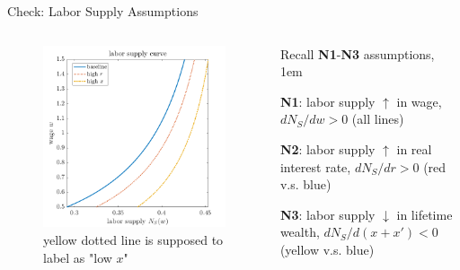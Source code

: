 \documentclass[11pt,aspectratio=43]{beamer}
\let\olditemize=\itemize
\let\endolditemize=\enditemize
\renewenvironment{itemize}{\olditemize \itemsep1em}{\endolditemize}
\theoremstyle{definition}
\begin{document}
\begin{frame}{Check: Labor Supply Assumptions}
\label{slide:Check__Labor_Supply_Assumptions}
    \begin{columns}
        \begin{column}{0.5\textwidth}
            \begin{figure}
                \caption{yellow dotted line is supposed to label as "low $ x $"}
                \includegraphics[width=\textwidth]{./figures/LaborSupplyInterestRateWealth.png}
            \end{figure}


        \end{column}
        \begin{column}{0.5\textwidth}
            Recall \textbf{N1}-\textbf{N3} assumptions,
            \begin{itemize}
                \item \textbf{N1}: labor supply $ \uparrow  $ in wage, $ d N_{S} / dw > 0 $ (all lines)
                \item \textbf{N2}: labor supply $ \uparrow  $ in real interest rate, $ d N_{S} / dr > 0 $ (red v.s. blue)
                \item \textbf{N3}: labor supply $ \downarrow  $ in lifetime wealth, $ d N_{S} / d( x + x' ) < 0 $ (yellow v.s. blue)
            \end{itemize}
        \end{column}
    \end{columns}
\end{frame}
\end{document}
